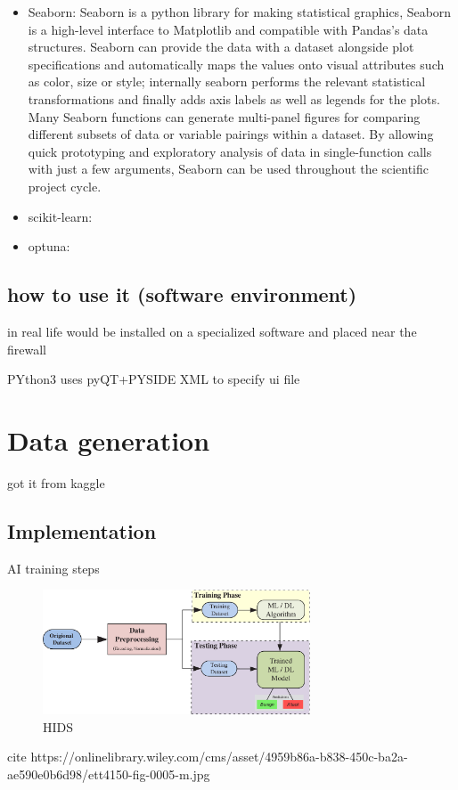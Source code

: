 \begin{itemize}
	\item Seaborn: Seaborn is a python library for making statistical graphics, Seaborn is a high-level interface to Matplotlib and compatible with Pandas's data structures. Seaborn can provide the data with a dataset alongside plot specifications and automatically maps the values onto visual attributes such as color, size or style; internally seaborn performs the relevant statistical transformations and finally adds axis labels as well as legends for the plots. Many Seaborn functions can generate multi-panel figures for comparing different subsets of data or variable pairings within a dataset. By allowing quick prototyping and exploratory analysis of data in single-function calls with just a few arguments, Seaborn can be used throughout the scientific project cycle.  \cite{seaborn}
	

	

	\item scikit-learn:

	\item optuna:

\end{itemize}




\subsection{how to use it (software environment)}
in real life would be installed on a specialized software and placed near the firewall

PYthon3
uses pyQT+PYSIDE
XML to specify ui file













\section{Data generation}
got it from kaggle







\subsection{Implementation}
AI training steps


\begin{figure}[h]
	\centering
	\includegraphics[width=300px]{figures/ml_staps.jpg}
	\caption{HIDS \cite{geeksforgeeks}}
	\label{fig:HIDS}
\end{figure}
cite https://onlinelibrary.wiley.com/cms/asset/4959b86a-b838-450c-ba2a-ae590e0b6d98/ett4150-fig-0005-m.jpg




